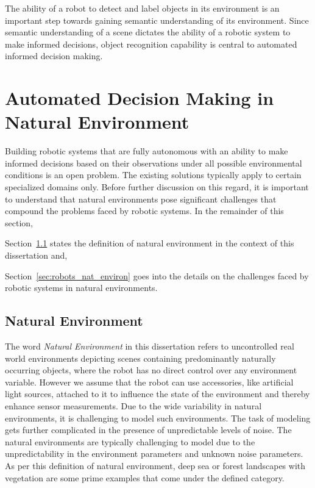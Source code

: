 The ability of a robot to detect and label objects in its environment is an important step towards gaining semantic understanding of its environment.
Since semantic understanding of a scene dictates the ability of a robotic system to make informed decisions, object recognition capability
is central to automated informed decision making.

\section{Automated Decision Making in Natural Environment}

Building robotic systems that are fully autonomous with an ability to make informed decisions based on their observations under all possible environmental conditions is an open problem.
The existing solutions typically apply to certain specialized domains only. 
Before further discussion on this regard, it is important to
understand that natural environments pose significant challenges that compound the problems faced by robotic systems.
In the remainder of this section, \begin{enumerate*}[label=(\roman*)] \item Section~\ref{sec:nat_environ_def} states the definition of natural environment in the context of this dissertation and, \item Section~\ref{sec:robots_nat_environ} goes into the details on the challenges faced by robotic systems in natural environments. \end{enumerate*}


\subsection{Natural Environment}
\label{sec:nat_environ_def}

The word \emph{Natural Environment} in this dissertation refers to uncontrolled real world environments depicting scenes containing predominantly naturally occurring objects, where the robot has 
no direct control over any environment variable. However we assume that the robot can use accessories, like artificial light sources, attached to it to influence the state of the environment and thereby enhance sensor measurements. 
Due to the wide variability in natural environments, 
it is challenging to model such environments.
The task of modeling gets further complicated in the presence of unpredictable levels of noise. The natural environments are typically challenging to model due to the unpredictability in the environment parameters and unknown noise parameters. 
As per this definition of natural environment, deep sea or forest landscapes with vegetation are some prime examples that come under the defined category.



